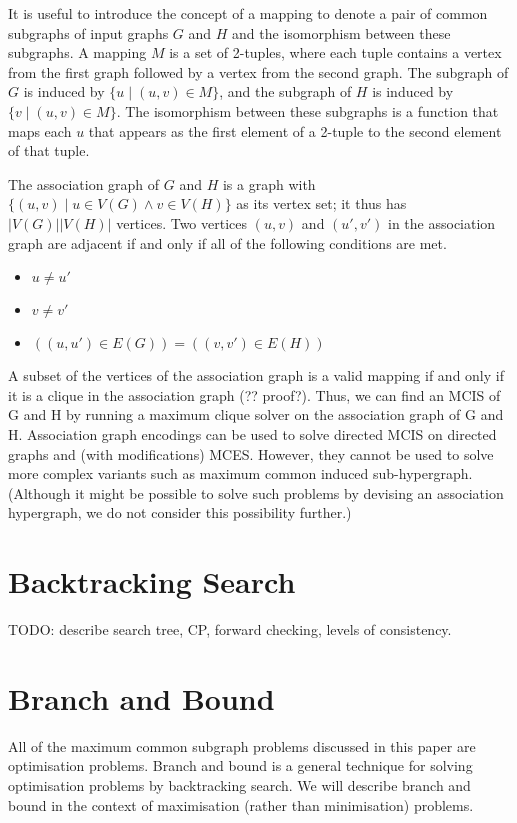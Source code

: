 It is useful to introduce the concept of a mapping to denote a pair of common
subgraphs of input graphs $G$ and $H$ and the isomorphism between these subgraphs.
A mapping $M$ is a set of 2-tuples, where each tuple contains a vertex from the
first graph followed by a vertex from the second graph. The subgraph of $G$ is
induced by $\{u \mid (u, v) \in M\}$, and the subgraph of $H$ is induced by $\{v \mid (u, v)
\in M\}$. The isomorphism between these subgraphs is a function that maps each $u$
that appears as the first element of a 2-tuple to the second element of that
tuple.

The association graph of $G$ and $H$ is a graph with $\{(u,v) \mid u \in V(G) \wedge v \in
V(H)\}$ as its vertex set; it thus has $|V(G)||V(H)|$ vertices. Two vertices $(u,v)$
and $(u',v')$ in the association graph are adjacent if and only if all of the
following conditions are met.

\begin{itemize}
  \item $u \not= u'$
  \item $v \not= v'$
  \item $((u,u') \in E(G)) = ((v,v') \in E(H))$
\end{itemize}

A subset of the vertices of the association graph is a valid mapping if and
only if it is a clique in the association graph (?? proof?). Thus, we can find
an MCIS of G and H by running a maximum clique solver on the association graph
of G and H. Association graph encodings can be used to solve directed MCIS on
directed graphs and (with modifications) MCES. However, they cannot be used to
solve more complex variants such as maximum common induced sub-hypergraph.
(Although it might be possible to solve such problems by devising an
association hypergraph, we do not consider this possibility further.)

\section{Backtracking Search}

TODO: describe search tree, CP, forward checking, levels of consistency.

\section{Branch and Bound}

All of the maximum common subgraph problems discussed in this paper are
optimisation problems.  Branch and bound is a general technique for solving
optimisation problems by backtracking search. We will describe branch and bound
in the context of maximisation (rather than minimisation) problems.

